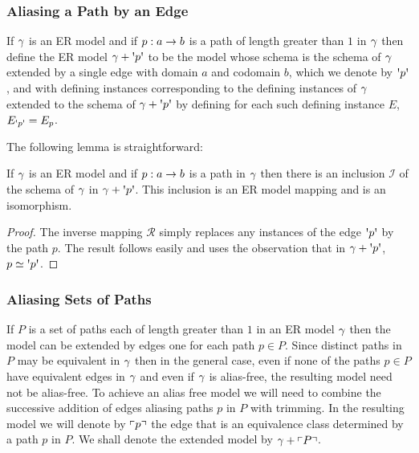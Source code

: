 \subsubsection{Aliasing a Path by an Edge}
\begin{definition}
If $\gamma$ is an ER model and if $p:a \rightarrow b$ is a path of length greater than $1$ in $\gamma$ then define the ER model $\gmodel + \sq{p}$ to be the model whose schema is the schema of $\gamma$ extended by a single edge with domain $a$ and codomain $b$, which we denote by $\sq{p}$, and with defining instances corresponding to the defining instances of $\gamma$ extended to the schema of $\gmodel + \sq{p}$ by defining for each such defining instance $E$, $E_{\sq{p}}=E_p$.
\end{definition} 

The following lemma is straightforward:
\begin{lemma}
If $\gamma$ is an ER model and if $p:a \rightarrow b$ is a path in $\gamma$ then
there is an inclusion  $\mathcal{I}$ of the schema of $\gamma$ in $\gmodel + \sq{p}$. This inclusion is an ER model mapping and is an isomorphism. 
\end{lemma}
\begin{proof}
The inverse mapping $\mathcal{R}$ simply replaces any instances of the edge $\sq{p}$ by the path $p$. The result follows easily and uses the observation that in $\gmodel + \sq{p}$, $p \simeq \sq{p}$.
\end{proof}

\subsubsection{Aliasing Sets of Paths}
\label{extensionbysetofpaths}
If $P$ is a set of paths each of length greater than $1$ in an ER model $\gamma$ then the model can be extended by edges one for each path $p \in P$. 
Since distinct paths in $P$ may be equivalent in $\gamma$ then in the general case, even if none of the paths 
$p \in P$ have equivalent edges in $\gamma$ and even if $\gamma$ is alias-free,  the resulting model need not be alias-free. 
To achieve an alias free model we will need to combine the successive addition of edges aliasing paths $p$ in $P$ with trimming.  
In the resulting model we will denote by $\left\ulcorner p\right\urcorner$ the edge that is an equivalence class determined by a path $p$ in $P$.
We shall denote the extended model by $\gamma + \left\ulcorner P\right\urcorner$. 

